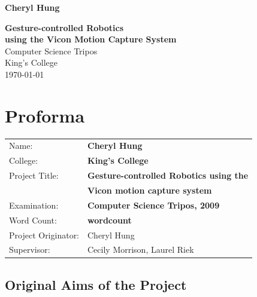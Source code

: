 \documentclass[12pt,a4,notitlepage]{report}
\renewcommand{\_}{\texttt{\symbol{95}}}
\newcommand{\<}{\texttt{\symbol{60}}}
\renewcommand{\>}{\texttt{\symbol{62}}}
\begin{document}



\pagestyle{empty}

\hfill{\LARGE \bf Cheryl Hung}

\vspace*{30mm}
\begin{center}
\Huge
{\bf Gesture-controlled Robotics \\
using the Vicon Motion Capture System} \\
\vspace*{25mm}
Computer Science Tripos \\
\vspace*{5mm}
King's College \\
\vspace*{5mm}
\today  %
\end{center}

\cleardoublepage


\setcounter{page}{1}
\pagestyle{plain}

\chapter*{Proforma}

{\large
\begin{tabular}{ll}
Name:               & \bf Cheryl Hung                       \\
College:            & \bf King's College                     \\
Project Title:      & \bf Gesture-controlled Robotics using the \\
                    & \bf Vicon motion capture system \\
Examination:        & \bf Computer Science Tripos, 2009        \\
Word Count:         & \bf wordcount \\
Project Originator: & Cheryl Hung                    \\
Supervisor:         & Cecily Morrison, Laurel Riek                    \\ 
\end{tabular}
}

\section*{Original Aims of the Project}
\end{document}
